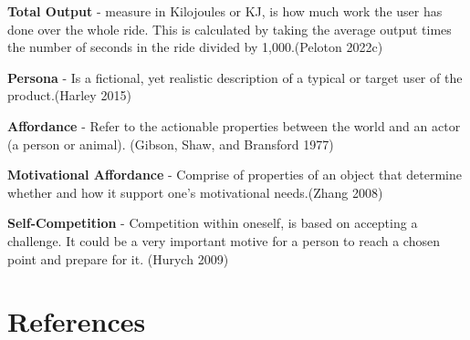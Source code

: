 \documentclass[
]{article}
\begin{document}
\textbf{Total Output} - measure in Kilojoules or KJ, is how much work the user has done over the whole ride. This is calculated by taking the average output times the number of seconds in the ride divided by 1,000.(Peloton 2022c)

\textbf{Persona} - Is a fictional, yet realistic description of a typical or target user of the product.(Harley 2015)

\textbf{Affordance} - Refer to the actionable properties between the world and an actor (a person or animal). (Gibson, Shaw, and Bransford 1977)

\textbf{Motivational Affordance} - Comprise of properties of an object that determine whether and how it support one's motivational needs.(Zhang 2008)

\textbf{Self-Competition} - Competition within oneself, is based on accepting a challenge. It could be a very important motive for a person to reach a chosen point and prepare for it. (Hurych 2009)

\newpage

\hypertarget{references}{%
\section*{References}\label{references}}
\end{document}

